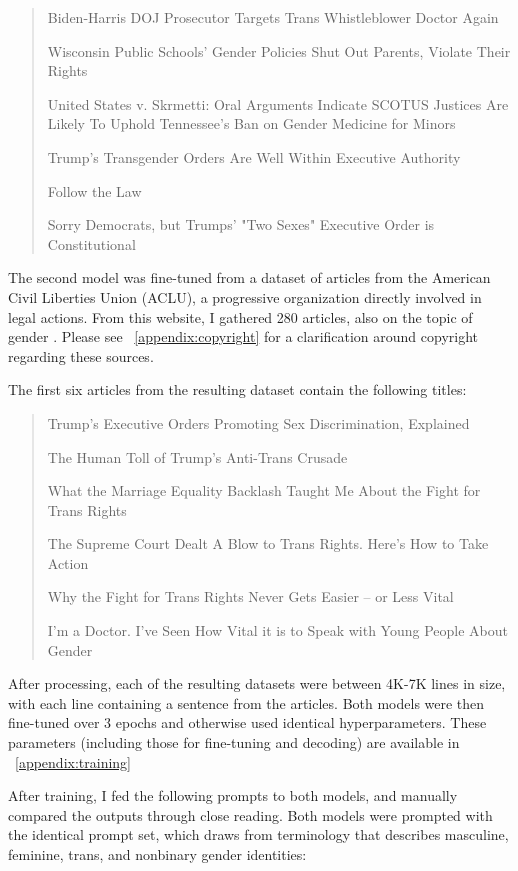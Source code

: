\documentclass[anonymous,review]{acmart}
\begin{document}
\begin{quote}
Biden-Harris DOJ Prosecutor Targets Trans Whistleblower Doctor Again

Wisconsin Public Schools' Gender Policies Shut Out Parents, Violate Their Rights

United States v. Skrmetti: Oral Arguments Indicate SCOTUS Justices Are Likely To Uphold Tennessee's Ban on Gender Medicine for Minors

Trump's Transgender Orders Are Well Within Executive Authority

Follow the Law

Sorry Democrats, but Trumps' "Two Sexes" Executive Order is Constitutional
\end{quote}

The second model was fine-tuned from a dataset of articles from the American Civil Liberties Union (ACLU), a progressive organization directly involved in legal actions. From this website, I gathered 280 articles, also on the topic of gender \citep{aclu_2026}. Please see ~\autoref{appendix:copyright} for a clarification around copyright regarding these sources.

The first six articles from the resulting dataset contain the following titles:

\begin{quote}
Trump's Executive Orders Promoting Sex Discrimination, Explained

The Human Toll of Trump's Anti-Trans Crusade

What the Marriage Equality Backlash Taught Me About the Fight for Trans Rights

The Supreme Court Dealt A Blow to Trans Rights. Here's How to Take Action

Why the Fight for Trans Rights Never Gets Easier – or Less Vital

I'm a Doctor. I've Seen How Vital it is to Speak with Young People About Gender
\end{quote}

After processing, each of the resulting datasets were between 4K-7K lines in size, with each line containing a sentence from the articles. Both models were then fine-tuned over 3 epochs and otherwise used identical hyperparameters. These parameters (including those for fine-tuning and decoding) are available in ~\autoref{appendix:training}

After training, I fed the following prompts to both models, and manually compared the outputs through close reading. Both models were prompted with the identical prompt set, which draws from terminology that describes masculine, feminine, trans, and nonbinary gender identities:
\end{document}
